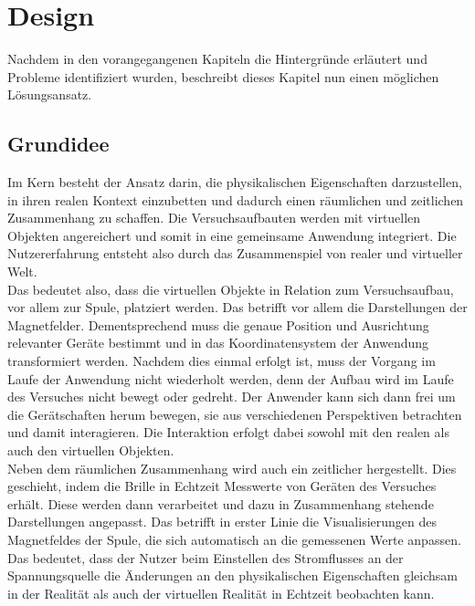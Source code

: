 \section{Design}

\label{sec-4}

Nachdem in den vorangegangenen Kapiteln die Hintergründe erläutert und Probleme identifiziert wurden, beschreibt dieses Kapitel nun einen möglichen Lösungsansatz.

\subsection{Grundidee}
\label{sec-4-1}
Im Kern besteht der Ansatz darin, die physikalischen Eigenschaften darzustellen, in ihren realen Kontext einzubetten und dadurch einen räumlichen und zeitlichen Zusammenhang zu schaffen. Die Versuchsaufbauten werden mit virtuellen Objekten angereichert und somit in eine gemeinsame Anwendung integriert. Die Nutzererfahrung entsteht also durch das Zusammenspiel von realer und virtueller Welt.\\

Das bedeutet also, dass die virtuellen Objekte in Relation zum Versuchsaufbau, vor allem zur Spule, platziert werden. Das betrifft vor allem die Darstellungen der Magnetfelder. Dementsprechend muss die genaue Position und Ausrichtung relevanter Geräte bestimmt und in das Koordinatensystem der Anwendung transformiert werden. Nachdem dies einmal erfolgt ist, muss der Vorgang im Laufe der Anwendung nicht wiederholt werden, denn der Aufbau wird im Laufe des Versuches nicht bewegt oder gedreht. Der Anwender kann sich dann frei um die Gerätschaften herum bewegen, sie aus verschiedenen Perspektiven betrachten und damit interagieren. Die Interaktion erfolgt dabei sowohl mit den realen als auch den virtuellen Objekten.\\

Neben dem räumlichen Zusammenhang wird auch ein zeitlicher hergestellt. Dies geschieht, indem die Brille in Echtzeit Messwerte von Geräten des Versuches erhält. Diese werden dann verarbeitet und dazu in Zusammenhang stehende Darstellungen angepasst. Das betrifft in erster Linie die Visualisierungen des Magnetfeldes der Spule, die sich automatisch an die gemessenen Werte anpassen. Das bedeutet, dass der Nutzer beim Einstellen des Stromflusses an der Spannungsquelle die Änderungen an den physikalischen Eigenschaften gleichsam in der Realität als auch der virtuellen Realität in Echtzeit beobachten kann. \\

